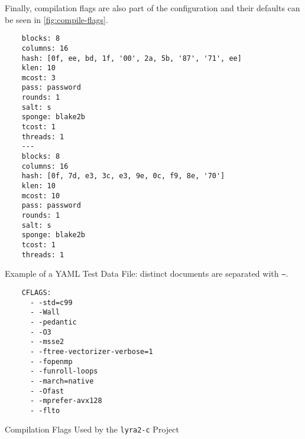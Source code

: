 Finally, compilation flags are also part of the configuration and their defaults can be seen in \autoref{fig:compile-flags}.

\begin{listing}
    \begin{verbatim}
    blocks: 8
    columns: 16
    hash: [0f, ee, bd, 1f, '00', 2a, 5b, '87', '71', ee]
    klen: 10
    mcost: 3
    pass: password
    rounds: 1
    salt: s
    sponge: blake2b
    tcost: 1
    threads: 1
    ---
    blocks: 8
    columns: 16
    hash: [0f, 7d, e3, 3c, e3, 9e, 0c, f9, 8e, '70']
    klen: 10
    mcost: 10
    pass: password
    rounds: 1
    salt: s
    sponge: blake2b
    tcost: 1
    threads: 1
    \end{verbatim}
    \caption{Example of a YAML Test Data File: distinct documents are separated with \texttt{---}.}
    \label{fig:yaml-data}
\end{listing}


\begin{listing}
    \begin{verbatim}
    CFLAGS:
      - -std=c99
      - -Wall
      - -pedantic
      - -O3
      - -msse2
      - -ftree-vectorizer-verbose=1
      - -fopenmp
      - -funroll-loops
      - -march=native
      - -Ofast
      - -mprefer-avx128
      - -flto
      \end{verbatim}
      \caption{Compilation Flags Used by the \texttt{lyra2-c} Project}
      \label{fig:compile-flags}
  \end{listing}
